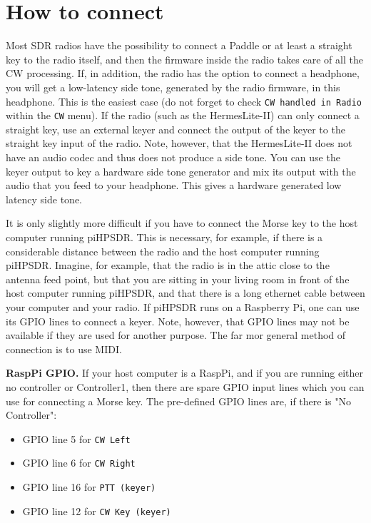 \documentclass[12pt]{book}
\def\rett#1{\texttt{\color{red}#1}}
\def\bltt#1{\texttt{\color{blue}#1}}
\def\pH{pi\-HPSDR\xspace}
\begin{document}
\section{How to connect}
Most SDR radios have the possibility to connect a Paddle or at least a straight key to the
radio itself, and then the firmware inside the radio takes care of all the CW processing.
If, in addition, the radio has the option to  connect a headphone, you will get a low-latency
side tone, generated by the radio firmware, in this headphone.
This is the easiest case (do not forget to check \rett{CW handled in Radio} within the
\bltt{CW} menu).
If the radio (such as the HermesLite-II) can only connect a straight key,
use an external keyer and connect the output of the keyer to the straight key input of the radio.
Note, however, that the HermesLite-II does not have an audio codec and thus does not produce a
side tone. You can use the keyer output to key a hardware side tone generator and mix its
output with the audio that you feed to your headphone. This gives a hardware generated low
latency side tone.

It is only slightly more difficult if you have to connect the Morse key to the host computer running
\pH. This is necessary, for example, if there is a considerable distance between the
radio and the host computer running \pH. Imagine, for example, that the radio is
in the attic close to the antenna feed point, but that you are sitting in your living room
in front of the host computer running \pH, and that there is a long ethernet cable
between your computer and your radio. If \pH runs on a Raspberry Pi, one can use
its GPIO lines to connect a keyer. Note, however, that GPIO lines may not be available
if they are used for another purpose. The far mor general method of connection is to use MIDI.

\textbf{RaspPi GPIO.} If your host computer is a RaspPi, and if you are running either no controller
or Controller1, then there are spare GPIO input lines which you can use for connecting a Morse
key. The pre-defined GPIO lines are, if there is "No Controller":

\begin{itemize}
\item{GPIO line 5 for \bltt{CW Left}}
\item{GPIO line 6 for \bltt{CW Right}}
\item{GPIO line 16 for \bltt{PTT (keyer)}}
\item{GPIO line 12 for \bltt{CW Key (keyer)}}
\end{itemize}
\end{document}
